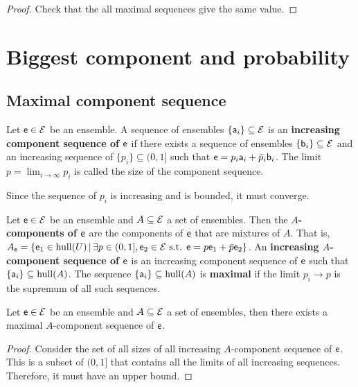 \begin{proof}
	Check that the all maximal sequences give the same value.
\end{proof}


\section{Biggest component and probability}

\subsection{Maximal component sequence}

\begin{defn}
	Let $\ens \in \Ens$ be an ensemble. A sequence of ensembles $\{\ens[a]_i\} \subseteq \Ens$ is an \textbf{increasing component sequence of $\ens$} if there exists a sequence of ensembles $\{\ens[b]_i\} \subseteq \Ens$ and an increasing sequence of $\{p_i\} \subseteq (0,1]$ such that $\ens = p_i \ens[a]_i + \bar{p}_i \ens[b]_i$. The limit $p = \lim_{i \to \infty} p_i$ is called the size of the component sequence.
\end{defn}

\begin{remark}
	Since the sequence of $p_i$ is increasing and is bounded, it must converge.
\end{remark}

\begin{defn}
	Let $\ens \in \Ens$ be an ensemble and $A \subseteq \Ens$ a set of ensembles. Then the \textbf{$A$-components of $\ens$} are the components of $\ens$ that are mixtures of $A$. That is, $A_{\ens} = \{ \ens_1 \in \hull(U) \, | \, \exists p \in (0,1], \ens_2 \in \Ens \text{ s.t. } \ens = p \ens_1 + \bar{p} \ens_2  \}$. An \textbf{increasing $A$-component sequence of $\ens$} is an increasing component sequence of $\ens$ such that $\{\ens[a]_i\} \subseteq \hull(A)$. The sequence $\{\ens[a]_i\} \subseteq \hull(A)$ is \textbf{maximal} if the limit $p_i \to p$ is the supremum of all such sequences.
\end{defn}

\begin{prop}
	Let $\ens \in \Ens$ be an ensemble and $A \subseteq \Ens$ a set of ensembles, then there exists a maximal $A$-component sequence of $\ens$.
\end{prop}

\begin{proof}
	Consider the set of all sizes of all increasing $A$-component sequence of $\ens$. This is a subset of $(0,1]$ that contains all the limits of all increasing sequences. Therefore, it must have an upper bound.
\end{proof}

